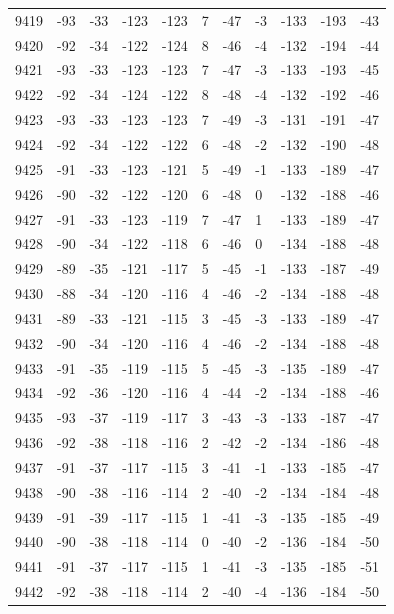 \begin{table}[H]
\begin{tabular}{lllllllllll}
9419 & -93 & -33 & -123 & -123 & 7 & -47 & -3 & -133 & -193 & -43 \\
9420 & -92 & -34 & -122 & -124 & 8 & -46 & -4 & -132 & -194 & -44 \\
9421 & -93 & -33 & -123 & -123 & 7 & -47 & -3 & -133 & -193 & -45 \\
9422 & -92 & -34 & -124 & -122 & 8 & -48 & -4 & -132 & -192 & -46 \\
9423 & -93 & -33 & -123 & -123 & 7 & -49 & -3 & -131 & -191 & -47 \\
9424 & -92 & -34 & -122 & -122 & 6 & -48 & -2 & -132 & -190 & -48 \\
9425 & -91 & -33 & -123 & -121 & 5 & -49 & -1 & -133 & -189 & -47 \\
9426 & -90 & -32 & -122 & -120 & 6 & -48 & 0 & -132 & -188 & -46 \\
9427 & -91 & -33 & -123 & -119 & 7 & -47 & 1 & -133 & -189 & -47 \\
9428 & -90 & -34 & -122 & -118 & 6 & -46 & 0 & -134 & -188 & -48 \\
9429 & -89 & -35 & -121 & -117 & 5 & -45 & -1 & -133 & -187 & -49 \\
9430 & -88 & -34 & -120 & -116 & 4 & -46 & -2 & -134 & -188 & -48 \\
9431 & -89 & -33 & -121 & -115 & 3 & -45 & -3 & -133 & -189 & -47 \\
9432 & -90 & -34 & -120 & -116 & 4 & -46 & -2 & -134 & -188 & -48 \\
9433 & -91 & -35 & -119 & -115 & 5 & -45 & -3 & -135 & -189 & -47 \\
9434 & -92 & -36 & -120 & -116 & 4 & -44 & -2 & -134 & -188 & -46 \\
9435 & -93 & -37 & -119 & -117 & 3 & -43 & -3 & -133 & -187 & -47 \\
9436 & -92 & -38 & -118 & -116 & 2 & -42 & -2 & -134 & -186 & -48 \\
9437 & -91 & -37 & -117 & -115 & 3 & -41 & -1 & -133 & -185 & -47 \\
9438 & -90 & -38 & -116 & -114 & 2 & -40 & -2 & -134 & -184 & -48 \\
9439 & -91 & -39 & -117 & -115 & 1 & -41 & -3 & -135 & -185 & -49 \\
9440 & -90 & -38 & -118 & -114 & 0 & -40 & -2 & -136 & -184 & -50 \\
9441 & -91 & -37 & -117 & -115 & 1 & -41 & -3 & -135 & -185 & -51 \\
9442 & -92 & -38 & -118 & -114 & 2 & -40 & -4 & -136 & -184 & -50 \\

\end{tabular}
\end{table}
